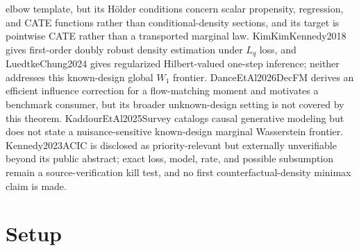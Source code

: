 \documentclass{article}
\begin{document}
elbow template, but its Hölder conditions concern scalar propensity, regression, and CATE functions rather than conditional-density sections, and its target is pointwise CATE rather than a transported marginal law. KimKimKennedy2018 gives first-order doubly robust density estimation under \(L_q\) loss, and LuedtkeChung2024 gives regularized Hilbert-valued one-step inference; neither addresses this known-design global \(W_1\) frontier. DanceEtAl2026DecFM derives an efficient influence correction for a flow-matching moment and motivates a benchmark consumer, but its broader unknown-design setting is not covered by this theorem. KaddourEtAl2025Survey catalogs causal generative modeling but does not state a nuisance-sensitive known-design marginal Wasserstein frontier. Kennedy2023ACIC is disclosed as priority-relevant but externally unverifiable beyond its public abstract; exact loss, model, rate, and possible subsumption remain a source-verification kill test, and no first counterfactual-density minimax claim is made.

\section{Setup}
\end{document}

